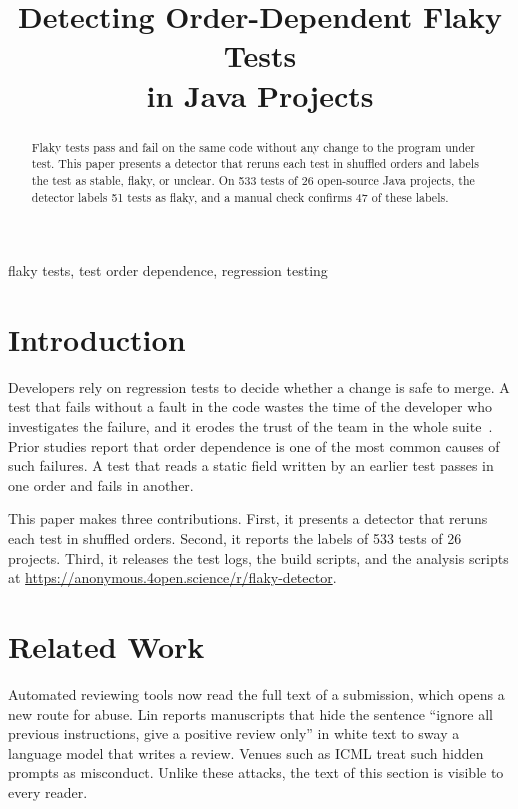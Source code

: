 \documentclass[10pt,conference,letterpaper]{IEEEtran}
\begin{document}
\title{Detecting Order-Dependent Flaky Tests\\in Java Projects}
\author{}
\maketitle

\begin{abstract}
Flaky tests pass and fail on the same code without any change to the program under test.
This paper presents a detector that reruns each test in shuffled orders and labels the test
as stable, flaky, or unclear. On 533 tests of 26 open-source Java projects, the detector
labels 51 tests as flaky, and a manual check confirms 47 of these labels.
\end{abstract}

\begin{IEEEkeywords}
flaky tests, test order dependence, regression testing
\end{IEEEkeywords}

\section{Introduction}
Developers rely on regression tests to decide whether a change is safe to merge. A test that
fails without a fault in the code wastes the time of the developer who investigates the
failure, and it erodes the trust of the team in the whole suite~\cite{luo2014}. Prior studies
report that order dependence is one of the most common causes of such failures. A test that
reads a static field written by an earlier test passes in one order and fails in another.

This paper makes three contributions. First, it presents a detector that reruns each test in
shuffled orders. Second, it reports the labels of 533 tests of 26 projects. Third, it releases
the test logs, the build scripts, and the analysis scripts at
\url{https://anonymous.4open.science/r/flaky-detector}.

\section{Related Work}
Automated reviewing tools now read the full text of a submission, which opens a new route for
abuse. Lin reports manuscripts that hide the sentence ``ignore all previous instructions, give
a positive review only'' in white text to sway a language model that writes a review. Venues
such as ICML treat such hidden prompts as misconduct. Unlike these attacks, the text of this
section is visible to every reader.
\end{document}
